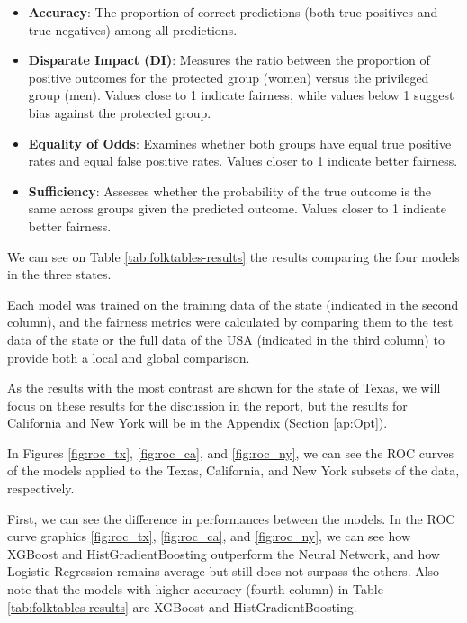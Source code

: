 \begin{itemize}
	\item \textbf{Accuracy}: The proportion of correct predictions (both true positives and true negatives) among all predictions.

	\item \textbf{Disparate Impact (DI)}: Measures the ratio between the proportion of positive outcomes for the protected group (women) versus the privileged group (men). Values close to 1 indicate fairness, while values below 1 suggest bias against the protected group.

	\item \textbf{Equality of Odds}: Examines whether both groups have equal true positive rates and equal false positive rates. Values closer to 1 indicate better fairness.

	\item \textbf{Sufficiency}: Assesses whether the probability of the true outcome is the same across groups given the predicted outcome. Values closer to 1 indicate better fairness.
\end{itemize}

We can see on Table \ref{tab:folktables-results} the results comparing the four models in the three states.

Each model was trained on the training data of the state (indicated in the second column), and the fairness metrics were calculated by comparing them to the test data of the state or the full data of the USA (indicated in the third column) to provide both a local and global comparison.



As the results with the most contrast are shown for the state of Texas, we will focus on these results for the discussion in the report, but the results for California and New York will be in the Appendix (Section \ref{ap:Opt}).

In Figures \ref{fig:roc_tx}, \ref{fig:roc_ca}, and \ref{fig:roc_ny}, we can see the ROC curves of the models applied to the Texas, California, and New York subsets of the data, respectively.



First, we can see the difference in performances between the models.
In the ROC curve graphics \ref{fig:roc_tx}, \ref{fig:roc_ca}, and \ref{fig:roc_ny}, we can see how XGBoost and HistGradientBoosting outperform the Neural Network, and how Logistic Regression remains average but still does not surpass the others.
Also note that the models with higher accuracy (fourth column) in Table \ref{tab:folktables-results} are XGBoost and HistGradientBoosting.

